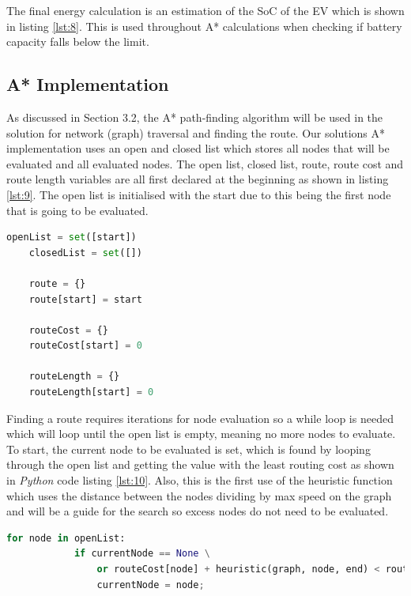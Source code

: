 \documentclass[11pt]{report}
\begin{document}
The final energy calculation is an estimation of the SoC of the EV which is shown in listing \ref{lst:8}. This is used throughout A* calculations when checking if battery capacity falls below the limit.

\subsection{A* Implementation}

As discussed in Section 3.2, the A* path-finding algorithm will be used in the solution for network (graph) traversal and finding the route. Our solutions A* implementation uses an open and closed list which stores all nodes that will be evaluated and all evaluated nodes. The open list, closed list, route, route cost and route length variables are all first declared at the beginning as shown in listing \ref{lst:9}. The open list is initialised with the start due to this being the first node that is going to be evaluated.

\begin{lstlisting}[language=Python, caption=Variable intialisations for A* search, label={lst:9}]
    openList = set([start])
    closedList = set([])

    route = {}
    route[start] = start

    routeCost = {}
    routeCost[start] = 0

    routeLength = {}
    routeLength[start] = 0
\end{lstlisting}

Finding a route requires iterations for node evaluation so a while loop is needed which will loop until the open list is empty, meaning no more nodes to evaluate. To start, the current node to be evaluated is set, which is found by looping through the open list and getting the value with the least routing cost as shown in \emph{Python} code listing \ref{lst:10}. Also, this is the first use of the heuristic function which uses the distance between the nodes dividing by max speed on the graph and will be a guide for the search so excess nodes do not need to be evaluated. 

\begin{lstlisting}[language=Python, caption=Choosing which node to evaluate next in A*, label={lst:10}]
    for node in openList:
            if currentNode == None \
                or routeCost[node] + heuristic(graph, node, end) < routeCost[currentNode] + heuristic(graph, currentNode, end):
                currentNode = node;
\end{lstlisting}
\end{document}
